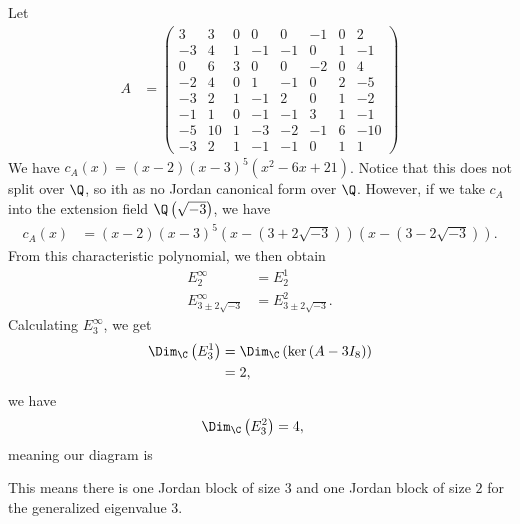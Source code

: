 \documentclass[10pt]{mypackage}
\begin{document}
\begin{example}
  Let
  \begin{align*}
    A &=  \begin{pmatrix}
3 & 3 & 0 & 0 & 0 & -1 & 0 & 2 \\
-3 & 4 & 1 & -1 & -1 & 0 & 1 & -1 \\
0 & 6 & 3 & 0 & 0 & -2 & 0 & 4 \\
-2 & 4 & 0 & 1 & -1 & 0 & 2 & -5 \\
-3 & 2 & 1 & -1 & 2 & 0 & 1 & -2 \\
-1 & 1 & 0 & -1 & -1 & 3 & 1 & -1 \\
-5 & 10 & 1 & -3 & -2 & -1 & 6 & -10 \\
-3 & 2 & 1 & -1 & -1 & 0 & 1 & 1 
\end{pmatrix}  
  \end{align*}
  We have $c_A(x) = \left(x-2\right)\left(x-3\right)^5\left(x^2-6x+21\right)$. Notice that this does not split over $\Q$, so ith as no Jordan canonical form over $\Q$. However, if we take $c_A$ into the extension field $\Q\left(\sqrt{-3}\right)$, we have
  \begin{align*}
    c_A(x) &= \left(x-2\right)\left(x-3\right)^5\left(x-\left(3 + 2\sqrt{-3}\right)\right)\left(x-\left(3-2\sqrt{-3}\right)\right).
  \end{align*}
  From this characteristic polynomial, we then obtain
  \begin{align*}
    E_2^{\infty} &= E_{2}^{1}\\
    E_{3\pm2\sqrt{-3}}^{\infty} &= E_{3\pm2\sqrt{-3}}^{2}.
  \end{align*}
  Calculating $E_{3}^{\infty}$, we get
  \begin{align*}
    \Dim_{\C}\left(E_3^{1}\right) &= \Dim_{\C}\left(\ker\left(A - 3I_{8}\right)\right)\\
    &= 2,
  \end{align*}
  we have
  \begin{align*}
    \Dim_{\C}\left(E_{3}^{2}\right) &= 4,
  \end{align*}
  meaning our diagram is
  \begin{center}
  \end{center}
  This means there is one Jordan block of size $3$ and one Jordan block of size $2$ for the generalized eigenvalue $3$.
\end{example}
\end{document}
